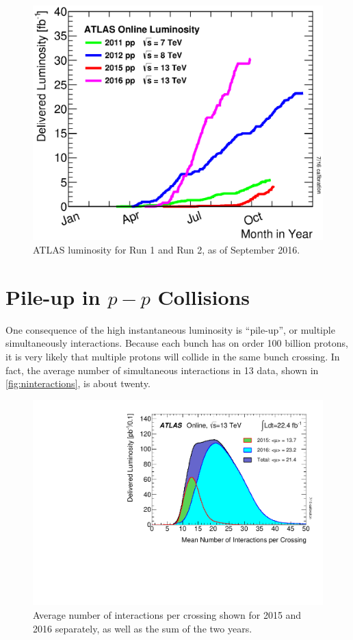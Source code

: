 \begin{centering}
\begin{figure}[!hbt]
\myfloatalign
\includegraphics[width=.90\linewidth]{figures/lhc/intlumivsyear.eps}
\caption{ATLAS luminosity for Run 1 and Run 2, as of September 2016.}
\label{fig:lumi_vs_year}
\end{figure} 
\end{centering}

\section{Pile-up in $p-p$ Collisions}
\label{sec:pileup}

One consequence of the high instantaneous luminosity is ``pile-up'', or multiple simultaneously interactions. Because each bunch has on order 100 billion protons, it is very likely that multiple protons will collide in the same bunch crossing. In fact, the average number of simultaneous interactions in 13 \tev data, shown in \autoref{fig:ninteractions}, is about twenty. 

\begin{centering}
\begin{figure}[!hbt]
\myfloatalign
\includegraphics[width=.85\linewidth]{figures/atlas/mu_2015_2016_ICHEP.pdf}
\caption{Average number of interactions per crossing shown for 2015 and 2016 separately, as well as the sum of the two years.}
\label{fig:ninteractions}
\end{figure}
\end{centering}

